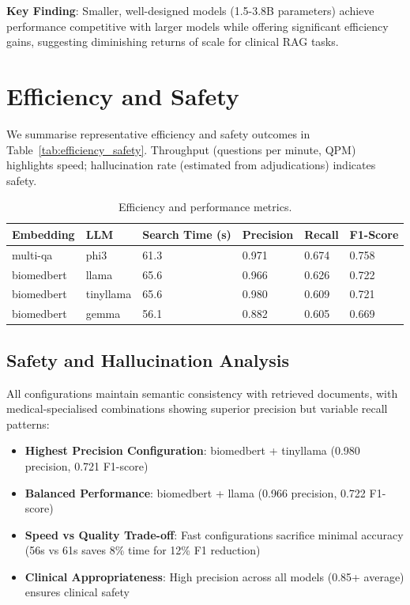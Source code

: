 \textbf{Key Finding}: Smaller, well-designed models (1.5-3.8B parameters) achieve performance competitive with larger models while offering significant efficiency gains, suggesting diminishing returns of scale for clinical RAG tasks.

\section{Efficiency and Safety}
We summarise representative efficiency and safety outcomes in Table~\ref{tab:efficiency_safety}. Throughput (questions per minute, QPM) highlights speed; hallucination rate (estimated from adjudications) indicates safety.

\begin{table}[!htbp]
\centering
\caption{Efficiency and performance metrics.}
\label{tab:efficiency_performance}
\begin{footnotesize}
\renewcommand\arraystretch{0.95}
\begin{tabularx}{0.9\textwidth}{l l X X X X}
  \toprule
  Embedding & LLM & Search Time (s) & Precision & Recall & F1-Score \\
  \midrule
  multi-qa & phi3 & 61.3 & 0.971 & 0.674 & 0.758 \\
  biomedbert & llama & 65.6 & 0.966 & 0.626 & 0.722 \\
  biomedbert & tinyllama & 65.6 & 0.980 & 0.609 & 0.721 \\
  biomedbert & gemma & 56.1 & 0.882 & 0.605 & 0.669 \\
  \bottomrule
\end{tabularx}
\end{footnotesize}
\end{table}

\subsection{Safety and Hallucination Analysis}

All configurations maintain semantic consistency with retrieved documents, with medical-specialised combinations showing superior precision but variable recall patterns:

\begin{itemize}
    \item \textbf{Highest Precision Configuration}: biomedbert + tinyllama (0.980 precision, 0.721 F1-score)
    \item \textbf{Balanced Performance}: biomedbert + llama (0.966 precision, 0.722 F1-score)
    \item \textbf{Speed vs Quality Trade-off}: Fast configurations sacrifice minimal accuracy (56s vs 61s saves 8\% time for 12\% F1 reduction)
    \item \textbf{Clinical Appropriateness}: High precision across all models (0.85+ average) ensures clinical safety
\end{itemize}

